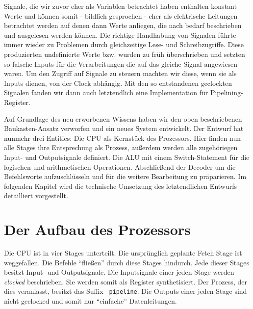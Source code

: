 \documentclass[paper=a4,fontsize=11pt,twocolumn]{scrreprt}
\begin{document}
Signale, die wir zuvor eher als Variablen betrachtet haben enthalten konstant Werte und können somit - bildlich gesprochen - eher als elektrische Leitungen betrachtet werden auf denen dann Werte anliegen, die nach bedarf beschrieben und ausgelesen werden können.
Die richtige Handhabung von Signalen führte immer wieder zu Problemen durch gleichzeitige Lese- und Schreibzugriffe.
Diese produzierten undefinierte Werte bzw. wurden zu früh überschrieben und setzten so falsche Inputs für die Verarbeitungen die auf das gleiche Signal angewiesen waren.
Um den Zugriff auf Signale zu steuern machten wir diese, wenn sie als Inputs dienen, von der Clock abhängig.
Mit den so entstandenen geclockten Signalen fanden wir dann auch letztendlich eine Implementation für Pipelining-Register.

Auf Grundlage des neu erworbenen Wissens haben wir den oben beschriebenen Baukasten-Ansatz verworfen und ein neues System entwickelt. 
Der Entwurf hat nunmehr drei Entities: Die CPU als Kernstück des Prozessors.
Hier finden nun alle Stages ihre Entsprechung als Prozess, außerdem werden alle zugehöriegen Input- und Outputsignale definiert.
Die ALU mit einem Switch-Statement für die logischen und arithmetischen Operationen.
Abschließend der Decoder um die Befehlsworte aufzuschlüsseln und für die weitere Bearbeitung zu präparieren.
Im folgenden Kapitel wird die technische Umsetzung des letztendlichen Entwurfs detailliert vorgestellt.

\section{Der Aufbau des Prozessors}
\label{sec:aufbau_des_prozessors}

Die CPU ist in vier Stages unterteilt.
Die ursprünglich geplante Fetch Stage ist weggefallen.
Die Befehle \enquote{fließen} durch diese Stages hindurch.
Jede dieser Stages besitzt Input- und Outputsignale.
Die Inputsignale einer jeden Stage werden \textit{clocked} beschrieben.
Sie werden somit als Register synthetisiert.
Der Prozess, der dies veranlasst, besitzt das Suffix \texttt{\_pipeline}.
Die Outputs einer jeden Stage sind nicht geclocked und somit nur \enquote{einfache} Datenleitungen.
\end{document}
